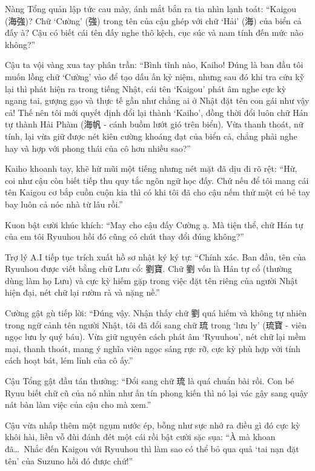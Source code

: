 \documentclass[../main.tex]{subfiles}
\begin{document}
Nàng Tổng quản lập tức cau mày, ánh mắt bắn ra tia nhìn lạnh toát: ``Kaigou (海強)? Chữ `Cường' (強) trong tên của cậu ghép với chữ `Hải' (海) của biển cả đấy à? Cậu có biết cái tên đấy nghe thô kệch, cục súc và nam tính đến mức nào không?''

Cậu ta vội vàng xua tay phân trần: ``Bình tĩnh nào, Kaiho! Đúng là ban đầu tôi muốn lồng chữ `Cường' vào để tạo dấu ấn kỷ niệm, nhưng sau đó khi tra cứu kỹ lại thì phát hiện ra trong tiếng Nhật, cái tên `Kaigou' phát âm nghe cực kỳ ngang tai, gượng gạo và thực tế gần như chẳng ai ở Nhật đặt tên con gái như vậy cả! Thế nên tôi mới quyết định đổi lại thành `Kaiho', đồng thời đổi luôn chữ Hán tự thành Hải Phàm (海帆 - cánh buồm lướt gió trên biển). Vừa thanh thoát, nữ tính, lại vừa giữ được nét kiên cường khoáng đạt của biển cả, chẳng phải nghe hay và hợp với phong thái của cô hơn nhiều sao?''

Kaiho khoanh tay, khẽ hừ mũi một tiếng nhưng nét mặt đã dịu đi rõ rệt: ``Hừ, coi như cậu còn biết tiếp thu quy tắc ngôn ngữ học đấy. Chứ nếu để tôi mang cái tên Kaigou cơ bắp cuồn cuộn kia thì có khi tôi đã cho cậu nếm thử một cú bẻ tay bay luôn cả nóc nhà từ lâu rồi.''

Kuon bật cười khúc khích: ``May cho cậu đấy Cường ạ. Mà tiện thể, chữ Hán tự của em tôi Ryuuhou hồi đó cũng có chút thay đổi đúng không?''

Trợ lý A.I tiếp tục trích xuất hồ sơ nhật ký ký tự: ``Chính xác. Ban đầu, tên của Ryuuhou được viết bằng chữ Lưu cổ: 劉寶. Chữ 劉 vốn là Hán tự cổ (thường dùng làm họ Lưu) và cực kỳ hiếm gặp trong việc đặt tên riêng của người Nhật hiện đại, nét chữ lại rườm rà và nặng nề.''

Cường gật gù tiếp lời: ``Đúng vậy. Nhận thấy chữ 劉 quá hiếm và không tự nhiên trong ngữ cảnh tên người Nhật, tôi đã đổi sang chữ 琉 trong `lưu ly' (琉寶 - viên ngọc lưu ly quý báu). Vừa giữ nguyên cách phát âm `Ryuuhou', nét chữ lại mềm mại, thanh thoát, mang ý nghĩa viên ngọc sáng rực rỡ, cực kỳ phù hợp với tính cách hoạt bát, lém lỉnh của cô ấy.''

Cậu Tổng gật đầu tán thưởng: ``Đổi sang chữ 琉 là quá chuẩn bài rồi. Con bé Ryuu biết chữ cũ của nó nhìn như ấn tín phong kiến thì nó lại vác gậy sang quậy nát bàn làm việc của cậu cho mà xem.''

Cậu vừa nhấp thêm một ngụm nước ép, bỗng như sực nhớ ra điều gì đó cực kỳ khôi hài, liền vỗ đùi đánh đét một cái rồi bật cười sặc sụa: ``À mà khoan đã\dots\ Nhắc đến Kaigou với Ryuuhou thì làm sao có thể bỏ qua quả `tai nạn đặt tên' của Suzuno hồi đó được chứ!''
\end{document}
